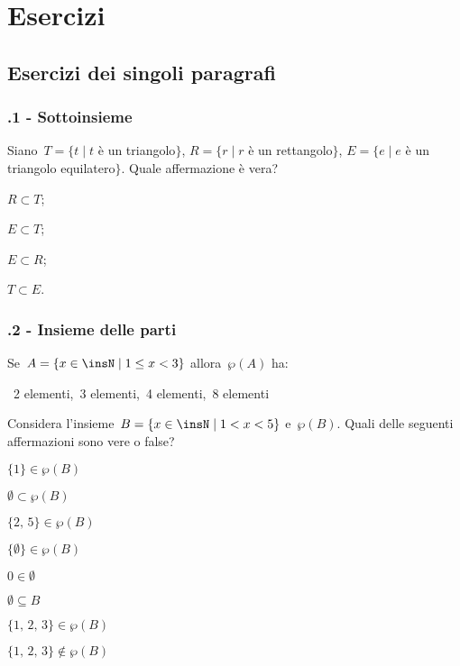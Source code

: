 \section{Esercizi}
\subsection{Esercizi dei singoli paragrafi}
\subsubsection*{\thechapter.1 - Sottoinsieme}

\begin{esercizio}
\label{ese:7.1}
 Siano~$T=\{t\mid t$ è un triangolo$\}$, $R=\{r\mid r$ è un rettangolo$\}$,
$E=\{e\mid e$ è un triangolo equilatero$\}$. Quale affermazione è vera?
\begin{multicols}{4}
\begin{enumeratea}
\item $R\subset T$;
\item $E\subset T$;
\item $E\subset R$;
\item $T\subset E$.
\end{enumeratea}
\end{multicols}
\end{esercizio}

\subsubsection*{\thechapter.2 - Insieme delle parti}
\begin{esercizio}
\label{ese:7.2}
Se~$A=\{x\in\insN\mid 1\le x<3\}$ allora~$\wp (A)$ ha:
\begin{center}
\boxA\quad~2 elementi,\quad\boxB\quad~3 elementi,\quad\boxC\quad~4 elementi,\quad\boxD\quad~8 elementi
\end{center}
\end{esercizio}

\begin{esercizio}
 \label{ese:7.3}
Considera l'insieme~$B=\{x\in\insN\mid 1<x<5\}$
e~$\wp (B)$. Quali delle seguenti affermazioni sono vere o false?
\begin{multicols}{2}
\TabPositions{4cm}
\begin{enumeratea}
 \item $\{1\}\in\wp (B)$ \tab\boxV\quad\boxF
 \item $\emptyset\subset\wp (B)$ \tab\boxV\quad\boxF
 \item $\{\text{2, 5}\}\in\wp (B)$ \tab\boxV\quad\boxF
 \item $\{\emptyset\}\in\wp (B)$ \tab\boxV\quad\boxF
 \item $0\in\emptyset $ \tab\boxV\quad\boxF
 \item $\emptyset\subseteq B$ \tab\boxV\quad\boxF
 \item $\{\text{1, 2, 3}\}\in\wp (B)$ \tab\boxV\quad\boxF
 \item $\{\text{1, 2, 3}\}\notin\wp (B)$ \tab\boxV\quad\boxF
\end{enumeratea}
\end{multicols}
\end{esercizio}


